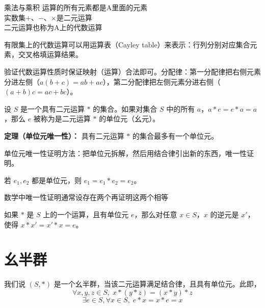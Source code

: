 \begin{note}[封闭 二元运算]
乘法与乘积 运算的所有元素都是A里面的元素 \\
实数集$+$、$-$、$\times$是二元运算 \\
二元运算也称为A上的代数运算
\end{note}

\begin{note}[运算表]
有限集上的代数运算可以用运算表（Cayley table）来表示：行列分别对应集合元素，交叉格填运算结果。
\end{note}

\begin{note}
验证代数运算性质时保证映射（运算）合法即可。分配律：第一分配律把右侧元素分进左侧（$a(b+c)=ab+ac$），第二分配律把左侧元素分进右侧（$(a+b)c=ac+bc$）。
\end{note}

\begin{definition}[单位元]
设 $S$ 是一个具有二元运算 $*$ 的集合。如果对集合 $S$ 中的所有 $a$，$a*e=e*a=a$，那么 $e$ 被称为是二元运算 $*$ 的单位元（幺元）。

\textbf{定理（单位元唯一性）：} 具有二元运算 $*$ 的集合最多有一个单位元。
\end{definition}

\begin{note}[单位元唯一性证明]
单位元唯一性证明方法：把单位元拆解，然后用结合律引出新的东西，唯一性证明。

若 $e_1,e_2$ 都是单位元，则 $e_1=e_1*e_2=e_2$。

数学中唯一性证明通常设存在两个再证明这两个相等
\end{note}

\begin{definition}[逆元]
如果 $*$ 是 $S$ 上的一个运算，且有单位元 $e$，那么对任意 $x\in S$，$x$ 的逆元是 $x'$，使得 $x*x'=x'*x=e$。
\end{definition}

\section{幺半群}

\begin{definition}[幺半群（定义 1.1）]
我们说 $(S,*)$ 是一个幺半群，当该二元运算满足结合律，且具有单位元。此即，
\[
\forall x,y,z\in S,\;x*(y*z)=(x*y)*z
\]
\[
\exists e\in S,\forall x\in S,\;e*x=x*e=x
\]
\end{definition}

